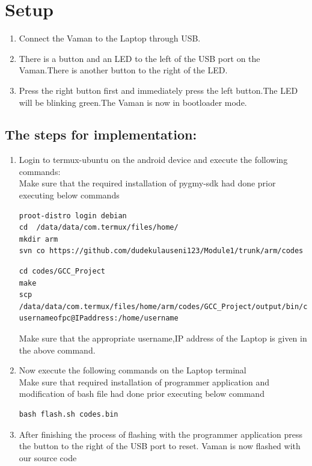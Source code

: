 \documentclass[10pt, a4paper]{article}
\begin{document}
\section{Setup}
\begin{enumerate}
\item Connect the Vaman to the Laptop through USB.
\item There is a button and an LED to the left of the USB port on the Vaman.There is another button to the right of the LED.
\item Press the right button first and immediately press the left button.The LED will be blinking green.The Vaman is now in bootloader mode.
\end{enumerate}
\subsection{The steps for implementation:}
\begin{enumerate}
\item Login to termux-ubuntu on the android device and execute the following commands:\\
Make sure that the required installation of pygmy-sdk had done prior executing below commands
\begin{lstlisting}
proot-distro login debian
cd  /data/data/com.termux/files/home/
mkdir arm
svn co https://github.com/dudekulauseni123/Module1/trunk/arm/codes
\end{lstlisting}
\begin{lstlisting}
cd codes/GCC_Project
make
scp /data/data/com.termux/files/home/arm/codes/GCC_Project/output/bin/codes.bin usernameofpc@IPaddress:/home/username
\end{lstlisting}
Make sure that the appropriate username,IP address of the Laptop is given in the above command.
\item Now execute the following commands on the Laptop terminal\\
Make sure that required installation of programmer application and modification of bash file had done prior executing below command
\begin{lstlisting}
bash flash.sh codes.bin
\end{lstlisting}
\item After finishing the process of flashing with the programmer application press the button to the right of the USB port to reset. Vaman is now flashed with our source code
\end{enumerate}
\end{document}
